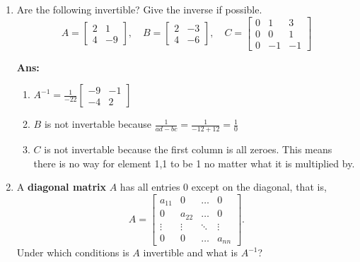 \documentclass[12pt,a4paper]{amsart}
\newcommand\sol[1]{
\medskip
\begin{mdframed}
\textbf{Ans:\\} #1
\end{mdframed}
\medskip
}
\begin{document}
\begin{enumerate}
 \sol{
  Multiplying the two matrices, we get
  $$
    \frac{1}{ad-bc}\left[\begin{matrix} a & b \\ c & d \end{matrix}\right] \left[\begin{matrix} d & -b \\ -c & a \end{matrix}\right]=
    \frac{1}{ad-bc}\left[\begin{matrix} ad-bc & ba-ab \\ dc-cd & ad-bc \end{matrix}\right] = \left[\begin{matrix} 1 & 0 \\ 0 & 1 \end{matrix}\right]
  $$
  Which is the $2\times2$ identity matrix, showing that the matrices are inverses of each other.
 }



\item
 Are the following invertible? Give the inverse if possible. 
\[ A = \left[\begin{matrix} 2 & 1 \\ 4 & -9 \end{matrix}\right],\quad
  B = \left[\begin{matrix} 2 & -3 \\ 4 & -6 \end{matrix}\right], \quad
  C = \left[\begin{matrix} 0 & 1 & 3 \\ 0 & 0 & 1 \\ 0 & -1 & -1 \end{matrix}\right]
\]

\sol{
  \begin{enumerate}
    \item
      $A^{-1}=\frac{1}{-22}\left[\begin{matrix} -9 & -1 \\ -4 & 2 \end{matrix}\right]$
    \item
      $B$ is not invertable because $\frac{1}{ad-bc}=\frac{1}{-12+12}=\frac{1}{0}$
    \item
      $C$ is not invertable because the first column is all zeroes. This means there is no way for element 1,1 to be 1 no matter what it is multiplied by.
  \end{enumerate}
}

\item
 A {\bf diagonal matrix} $A$ has all entries $0$ except on the diagonal, that is,
 \[ A = \left[\begin{matrix} a_{11} & 0 &  \dots & 0 \\ 0 & a_{22} & \dots & 0 \\ \vdots & \vdots & \ddots & \vdots \\
     0 & 0 & \dots & a_{nn} \end{matrix}\right]. \]
 Under which conditions is $A$ invertible and what is $A^{-1}$? 




\end{enumerate}
\end{document}
